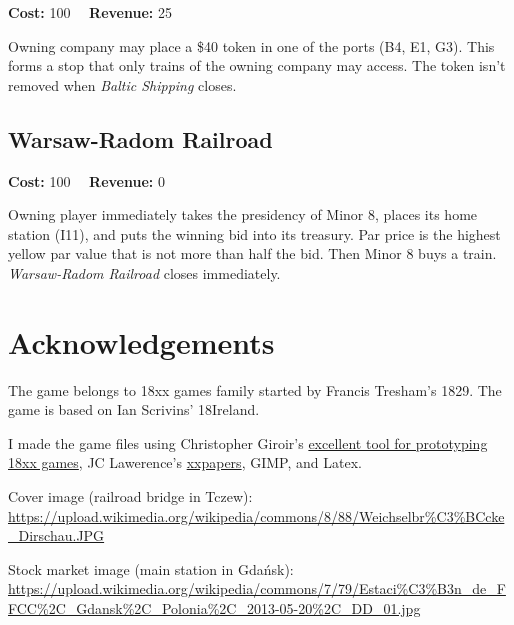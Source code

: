 \documentclass[10pt,a4paper,twocolumn]{article}
\begin{document}
\textbf{Cost:} 100 ~~\textbf{Revenue:} 25

Owning company may place a \$40 token in one of the ports (B4, E1, G3). This forms a stop that only trains of the owning company may access. The token isn't removed when \textit{Baltic Shipping} closes.

\subsection{Warsaw-Radom Railroad}

\textbf{Cost:} 100 ~~\textbf{Revenue:} 0

Owning player immediately takes the presidency of Minor 8, places its home station (I11), and puts the winning bid into its treasury. Par price is the highest yellow par value that is not more than half the bid. Then Minor 8 buys a train. \textit{Warsaw-Radom Railroad} closes immediately.

\section{Acknowledgements}

The game belongs to 18xx games family started by Francis Tresham's 1829. The game is based on Ian Scrivins' 18Ireland.

I made the game files using Christopher Giroir's \href{https://github.com/kelsin/18xx}{excellent tool for prototyping 18xx games}, JC Lawerence's \href{https://github.com/clearclaw/xxpaper}{xxpapers}, GIMP, and Latex.

Cover image (railroad bridge in Tczew): \url{https://upload.wikimedia.org/wikipedia/commons/8/88/Weichselbr\%C3\%BCcke_Dirschau.JPG}

Stock market image (main station in Gdańsk): \url{https://upload.wikimedia.org/wikipedia/commons/7/79/Estaci\%C3\%B3n_de_FFCC\%2C_Gdansk\%2C_Polonia\%2C_2013-05-20\%2C_DD_01.jpg}
\end{document}
